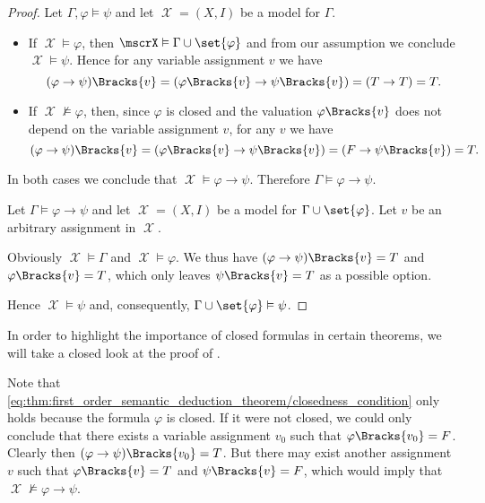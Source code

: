 \begin{proof}
  \SufficiencySubProof Let \( \Gamma, \varphi \vDash \psi \) and let \( \mscrX = (X, I) \) be a model for \( \Gamma \).

  \begin{itemize}
    \item If \( \mscrX \vDash \varphi \), then \( \mscrX \vDash \Gamma \cup \set{ \varphi } \) and from our assumption we conclude \( \mscrX \vDash \psi \). Hence for any variable assignment \( v \) we have
    \begin{equation*}
      (\varphi \rightarrow \psi)\Bracks{v}
      =
      (\varphi\Bracks{v} \rightarrow \psi\Bracks{v})
      =
      (T \rightarrow T)
      =
      T.
    \end{equation*}

    \item If \( \mscrX \not\vDash \varphi \), then, since \( \varphi \) is closed and the valuation \( \varphi\Bracks{v} \) does not depend on the variable assignment \( v \), for any \( v \) we have
    \begin{equation}\label{eq:thm:first_order_semantic_deduction_theorem/closedness_condition}
      (\varphi \rightarrow \psi)\Bracks{v}
      =
      (\varphi\Bracks{v} \rightarrow \psi\Bracks{v})
      =
      (F \rightarrow \psi\Bracks{v})
      =
      T.
    \end{equation}

  \end{itemize}

  In both cases we conclude that \( \mscrX \vDash \varphi \rightarrow \psi \). Therefore \( \Gamma \vDash \varphi \rightarrow \psi \).

  \NecessitySubProof Let \( \Gamma \vDash \varphi \rightarrow \psi \) and let \( \mscrX = (X, I) \) be a model for \( \Gamma \cup \set{ \varphi } \). Let \( v \) be an arbitrary assignment in \( \mscrX \).

  Obviously \( \mscrX \vDash \Gamma \) and \( \mscrX \vDash \varphi \). We thus have \( (\varphi \rightarrow \psi)\Bracks{v} = T \) and \( \varphi\Bracks{v} = T \), which only leaves \( \psi\Bracks{v} = T \) as a possible option.

  Hence \( \mscrX \vDash \psi \) and, consequently, \( \Gamma \cup \set{ \varphi } \vDash \psi \).
\end{proof}

\begin{remark}\label{rem:deduction_with_free_variables}
  In order to highlight the importance of closed formulas in certain theorems, we will take a closed look at the proof of .

  Note that \eqref{eq:thm:first_order_semantic_deduction_theorem/closedness_condition} only holds because the formula \( \varphi \) is closed. If it were not closed, we could only conclude that there exists a variable assignment \( v_0 \) such that \( \varphi\Bracks{v_0} = F \). Clearly then \( (\varphi \rightarrow \psi)\Bracks{v_0} = T \). But there may exist another assignment \( v \) such that \( \varphi\Bracks{v} = T \) and \( \psi\Bracks{v} = F \), which would imply that \( \mscrX \not\vDash \varphi \rightarrow \psi \).
\end{remark}
